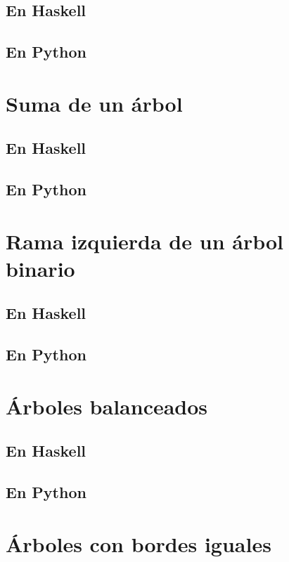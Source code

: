 \documentclass[a4paper,12pt,twoside]{book}
\begin{document}
\subsection{En Haskell}
\subsection{En Python}

\section{Suma de un árbol}
\subsection{En Haskell}
\subsection{En Python}

\section{Rama izquierda de un árbol binario}
\subsection{En Haskell}
\subsection{En Python}

\section{Árboles balanceados}
\subsection{En Haskell}
\subsection{En Python}

\section{Árboles con bordes iguales}
\end{document}
